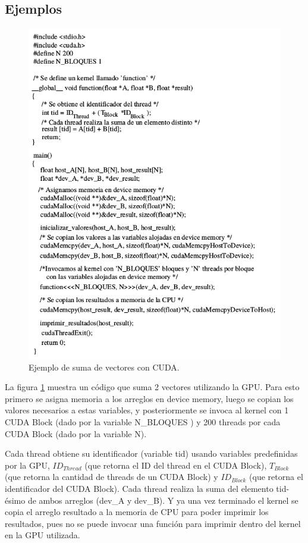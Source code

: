 \subsection*{Ejemplos}

\begin{figure}[hbtp]
\centering
\includegraphics[scale=0.6]{fig/Ejemplo_gpu.png}
\caption{\label{ejemplo_gpu_suma}Ejemplo de suma de vectores con CUDA.}
\end{figure}

La figura \ref{ejemplo_gpu_suma} muestra un código que suma 2 vectores utilizando la GPU. Para esto primero se asigna memoria a los arreglos en device memory, luego se copian los valores necesarios a estas variables, y posteriormente se invoca al kernel con 1 CUDA Block (dado por la variable N\_BLOQUES ) y 200 threads por cada CUDA Block (dado por la variable N).

Cada thread obtiene su identificador (variable tid) usando variables predefinidas por la GPU, $ID_{Thread}$ (que retorna el ID del thread en el CUDA Block), $T_{Block}$ (que retorna la cantidad de threads de un CUDA Block) y $ID_{Block}$ (que retorna el identificador del CUDA Block). Cada thread realiza la suma del elemento tid-ésimo de ambos arreglos (dev\_A y dev\_B). Y ya una vez terminado el kernel se copia el arreglo resultado a la memoria de CPU para poder imprimir los resultados, pues no se puede invocar una función para imprimir dentro del kernel en la GPU utilizada.

